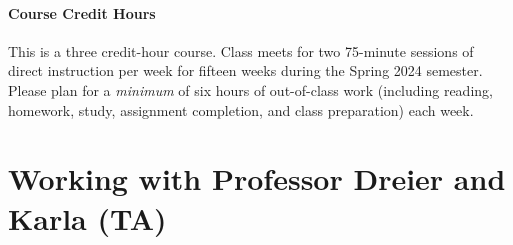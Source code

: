 \documentclass[11pt]{article}
\begin{document}

\vspace{-5pt}
\paragraph{Course Credit Hours} This is a three credit-hour course. Class meets for two 75-minute sessions of direct instruction per week for fifteen weeks during the Spring 2024 semester. Please plan for a \textit{minimum} of six hours of out-of-class work (including reading, homework, study, assignment completion, and class preparation) each week.

\section*{Working with Professor Dreier and Karla (TA)}
\end{document}
